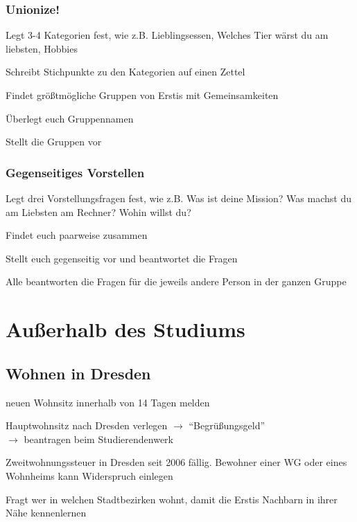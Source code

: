 \documentclass[a4paper,12pt]{scrreprt}
\begin{document}
\subsubsection{Unionize!}
\begin{itemize*}
    \item Legt 3-4 Kategorien fest, wie z.B. Lieblingsessen, Welches Tier wärst du am liebsten, Hobbies
    \item Schreibt Stichpunkte zu den Kategorien auf einen Zettel
    \item Findet größtmögliche Gruppen von Erstis mit Gemeinsamkeiten
    \item Überlegt euch Gruppennamen
    \item Stellt die Gruppen vor
\end{itemize*}

\subsubsection{Gegenseitiges Vorstellen}
\begin{itemize*}
    \item Legt drei Vorstellungsfragen fest, wie z.B. Was ist deine Mission? Was machst du am Liebsten am Rechner? Wohin willst du?
    \item Findet euch paarweise zusammen
    \item Stellt euch gegenseitig vor und beantwortet die Fragen
    \item Alle beantworten die Fragen für die jeweils andere Person in der ganzen Gruppe
\end{itemize*}

\section{Außerhalb des Studiums}

\subsection{Wohnen in Dresden}
\begin{itemize*}
    \item neuen Wohnsitz innerhalb von 14 Tagen melden
    \item Hauptwohnsitz nach Dresden verlegen $\rightarrow$  \enquote{Begrüßungsgeld}\\
    $\rightarrow$ beantragen beim Studierendenwerk
    \item Zweitwohnungssteuer in Dresden seit 2006 fällig. Bewohner einer WG oder eines Wohnheims kann Widerspruch einlegen
    \item Fragt wer in welchen Stadtbezirken wohnt, damit die Erstis Nachbarn in ihrer Nähe kennenlernen
\end{itemize*}
\end{document}
